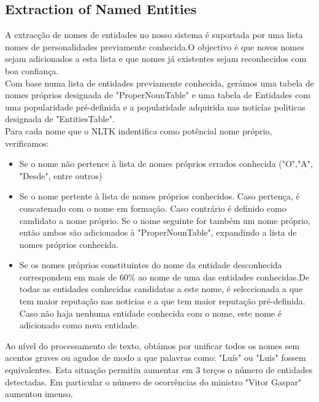 \subsection{Extraction of Named Entities}
\label{sec:entity_extraction}
A extracção de nomes de entidades no nosso sistema é suportada por uma lista nomes de personalidades previamente conhecida.O objectivo é que novos nomes sejam adicionados a esta lista e que nomes já existentes sejam reconhecidos com boa confiança.\\
Com base numa lista de entidades previamente conhecida, gerámos uma tabela de nomes próprios designada de "ProperNounTable" e uma tabela de Entidades com uma popularidade pré-definida e a popularidade adquirida nas noticías politicas designada de "EntitiesTable".\\
Para cada nome que o NLTK indentifica como potêncial nome próprio, verificamos:
\begin{itemize}
\item Se o nome não pertence à lista de nomes próprios errados conhecida ("O","A", "Desde", entre outros)
\item Se o nome pertente à lista de nomes próprios conhecidos. Caso pertença, é concatenado com o nome em formação. Caso contrário é definido como candidato a nome próprio. Se o nome seguinte for também um nome próprio, então ambos são adicionados à "ProperNounTable", expandindo a lista de nomes próprios conhecida. 
\item Se os nomes próprios constituintes do nome da entidade desconhecida correspondem em mais de 60\% ao nome de uma das entidades conhecidas.De todas as entidades conhecidas candidatas a este nome, é seleccionada a que tem maior reputação nas noticias e a que tem maior reputação pré-definida. Caso não haja nenhuma entidade conhecida com o nome, este nome é adicionado como nova entidade.
\end{itemize}

Ao nível do processamento de texto, obtámos por unificar todos os nomes sem acentos graves ou agudos de modo a que palavras como: "Luís" ou "Luis" fossem equivalentes. Esta situação permitiu aumentar em 3 terços o número de entidades detectadas. Em particular o número de ocorrências do ministro "Vitor Gaspar" aumentou imenso. 